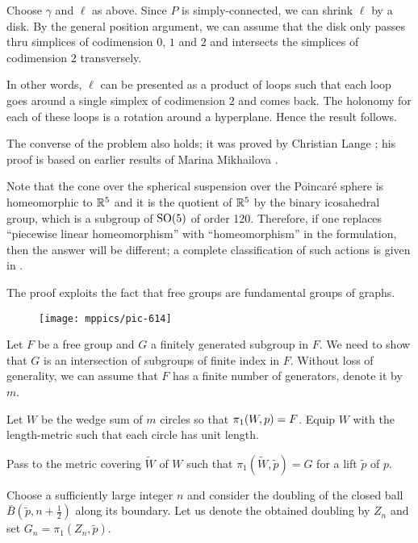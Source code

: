 Choose $\gamma$ and $\ell$ as above.
Since $P$ is simply-connected, we can shrink $\ell$ by a disk.
By the general position argument, we can assume that the disk 
only passes thru simplices of codimension $0$, $1$ and $2$
and intersects the simplices of codimension $2$ transversely.

In other words, $\ell$ can be presented as a product of 
loops such that each loop goes around a single simplex of codimension $2$ and comes back.
The holonomy for each of these loops is a rotation around a hyperplane.
Hence the result follows.
\qeds

The converse of the problem also holds;
it was proved by Christian Lange \cite{lange};
his proof is based on earlier results of 
Marina Mikhailova \cite{mikhailova}.

Note that the cone over the spherical suspension over the Poincaré sphere is homeomorphic to $\mathbb{R}^5$ and it is the quotient of $\mathbb{R}^5$ by the binary icosahedral group, which is a subgroup of $\mathrm{SO}(5)$ of order 120. 
Therefore, 
if one replaces ``piecewise linear homeomorphism'' with ``homeomorphism'' in the formulation, 
then the answer will be different; 
a complete classification of such actions is given in \cite{lange}.

The proof exploits the fact that free groups are fundamental groups of graphs.


\begin{wrapfigure}{o}{38 mm}
\vskip-4mm
\centering
\texttt{[image: mppics/pic-614]}
\end{wrapfigure}

\medskip

Let $F$ be a free group and $G$ a finitely generated subgroup in $F$.
We need to show that $G$ is an intersection of subgroups of finite index in $F$.
Without loss of generality, we can assume that $F$ has a finite number of generators, denote it by $m$.

Let $W$ be the wedge sum of $m$ circles so that $\pi_1(W,p)\z=F$.
Equip $W$ with the length-metric such that each circle has unit length.

Pass to the metric covering $\tilde W$ of $W$ 
such that  $\pi_1(\tilde W,\tilde p)=G$ 
for a lift $\tilde p$ of $p$.

Choose a sufficiently large integer $n$ and consider the doubling of the closed ball $\bar B(\tilde p,n+\frac12)$ along  its boundary.
Let us denote the obtained doubling by $Z_n$ and set $G_n=\pi_1(Z_n,\tilde p)$.


